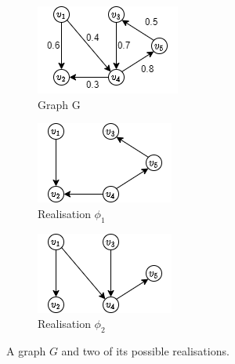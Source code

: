 \begin{figure}[!h]
\centering
\begin{subfigure}{0.3\textwidth}
    \includegraphics[width=\textwidth]{GSSI_thesisProposal/figures/real_1.png}
    \caption{Graph G}
    \label{fig:real_1}
\end{subfigure}
\hfill
\begin{subfigure}{0.3\textwidth}
    \includegraphics[width=\textwidth]{GSSI_thesisProposal/figures/real-2.png}
    \caption{Realisation $\phi_1$}
    \label{fig:real_2}
\end{subfigure}
\hfill
\begin{subfigure}{0.3\textwidth}
    \includegraphics[width=\textwidth]{GSSI_thesisProposal/figures/real-3.png}
    \caption{Realisation $\phi_2$}
    \label{fig:real_3}
\end{subfigure}
\caption{A graph $G$ and two of its possible realisations.}
\label{fig:real}
\end{figure}


